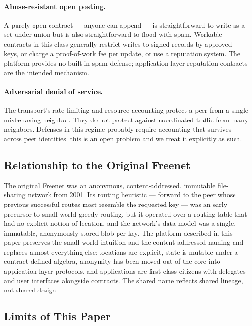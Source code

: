\paragraph{Abuse-resistant open posting.} A purely-open contract --- anyone can append --- is straightforward to write as a set under union but is also straightforward to flood with spam. Workable contracts in this class generally restrict writes to signed records by approved keys, or charge a proof-of-work fee per update, or use a reputation system. The platform provides no built-in spam defense; application-layer reputation contracts \citep{ghostkey} are the intended mechanism.

\paragraph{Adversarial denial of service.} The transport's rate limiting and resource accounting protect a peer from a single misbehaving neighbor. They do not protect against coordinated traffic from many neighbors. Defenses in this regime probably require accounting that survives across peer identities; this is an open problem and we treat it explicitly as such.

\subsection{Relationship to the Original Freenet}

The original Freenet \citep{clarke2001freenet} was an anonymous, content-addressed, immutable file-sharing network from 2001. Its routing heuristic --- forward to the peer whose previous successful routes most resemble the requested key --- was an early precursor to small-world greedy routing, but it operated over a routing table that had no explicit notion of location, and the network's data model was a single, immutable, anonymously-stored blob per key. The platform described in this paper preserves the small-world intuition and the content-addressed naming and replaces almost everything else: locations are explicit, state is mutable under a contract-defined algebra, anonymity has been moved out of the core into application-layer protocols, and applications are first-class citizens with delegates and user interfaces alongside contracts. The shared name reflects shared lineage, not shared design.

\subsection{Limits of This Paper}

